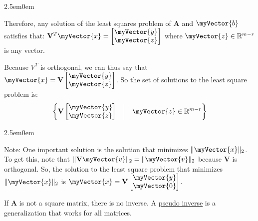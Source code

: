 \documentclass{book}
\newcommand{\hThree}{%
   \color{PineGreen}
   \fontsize{13}{15}\selectfont%
}
\newenvironment{myIndent}{%
   \begin{adjustwidth}{2.5em}{0em}%
}{%
   \end{adjustwidth}%
}
\newcommand{\udefine}[1]{%
   {\setulcolor{Red}%
   \setul{0.14em}{0.07em}%
   \ul{#1}}%
}
\newcommand{\retTwo}{\hfill\bigbreak}
\newcommand{\mVec}[1]{\myVector{#1}}
\newcommand{\mMat}[1]{\mathbf{#1}}
\begin{document}
{\begin{myIndent}
      Therefore, any solution of the least squares problem of $\mMat{A}$ and $\mVec{b}$ satisfies that: $\mMat{V}^T\mVec{x} = 
      \begin{bmatrix}
         \mVec{y} \\ \mVec{z}
      \end{bmatrix}$ where $\mVec{z} \in \mathbb{R}^{m-r}$ is any vector.\retTwo

      Because $V^T$ is orthogonal, we can thus say that $\mVec{x} = \mMat{V}\begin{bmatrix}
         \mVec{y} \\ \mVec{z}
      \end{bmatrix}$. So the set of solutions to the least square problem is:
      \[\left\{\mMat{V}\begin{bmatrix}
         \mVec{y} \\ \mVec{z}
      \end{bmatrix} \quad \middle| \quad \mVec{z} \in \mathbb{R}^{m-r}\right\}\]
      \retTwo \retTwo

      {\begin{myIndent} \hThree
         Note: One important solution is the solution that minimizes $\|\mVec{x}\|_2$. To get this, note that $\|\mMat{V}\mVec{v}\|_2 = \|\mVec{v}\|_2$ because $\mMat{V}$ is orthogonal. So, the solution to the least square problem that minimizes $\|\mVec{x}\|_2$ is $\mVec{x} = \mMat{V}\begin{bmatrix}
            \mVec{y} \\ \mVec{0}
         \end{bmatrix}$. 
      \end{myIndent}}
   \end{myIndent}}

   \newpage

   If $\mMat{A}$ is not a square matrix, there is no inverse. A \udefine{pseudo inverse} is a generalization that works for all matrices.
\end{document}
